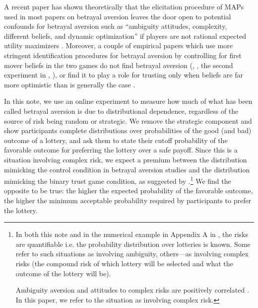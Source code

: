A recent paper has shown theoretically that the elicitation procedure of MAPs used in most papers on betrayal aversion leaves the door open to potential confounds for betrayal aversion such as ``ambiguity attitudes, complexity, different beliefs, and dynamic optimization'' if players are not rational expected utility maximizers \citep{Li2020a}.
Moreover, a couple of empirical papers which use more stringent identification procedures for betrayal aversion by controlling for first mover beliefs in the two games do not find betrayal aversion (\citeauthor{Fetchenhauer2012}, \citeyear{Fetchenhauer2012}, the second experiment in \citeauthor{Polipciuc2022inout}, \citeyear{Polipciuc2022inout}), or find it to play a role for trusting only when beliefs are far more optimistic than is generally the case \citep{Engelmann2021}.

In this note, we use an online experiment to measure how much of what has been called betrayal aversion is due to distributional dependence, regardless of the source of risk being random or strategic.
We remove the strategic component and show participants complete distributions over probabilities of the good (and bad) outcome of a lottery, and ask them to state their cutoff probability of the favorable outcome for preferring the lottery over a safe payoff.
Since this is a situation involving complex risk, we expect a premium between the distribution mimicking the control condition in betrayal aversion studies and the distribution mimicking the binary trust game condition, as suggested by \cite{Li2020a}.\footnote{
In both this note and in the numerical example in Appendix A in \cite{Li2020a}, the risks are quantifiable i.e. the probability distribution over lotteries is known.
Some refer to such situations as involving ambiguity, others---as involving complex risks (the compound risk of which lottery will be selected and what the outcome of the lottery will be).

Ambiguity aversion and attitudes to complex risks are positively correlated \citep{Armantier2016}.
In this paper, we refer to the situation as involving complex risk.
}
We find the opposite to be true: the higher the expected probability of the favorable outcome, the higher the minimum acceptable probability required by participants to prefer the lottery.

